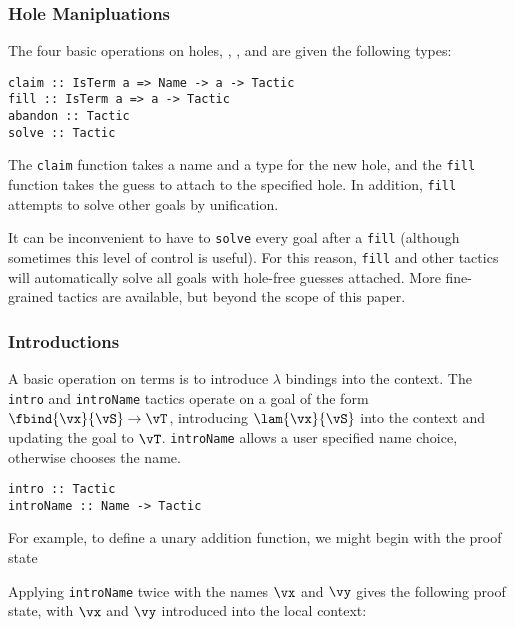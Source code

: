 \subsubsection{Hole Manipluations}

The four basic operations on holes, , ,
 and  are given the following types:
\begin{verbatim}
claim :: IsTerm a => Name -> a -> Tactic
fill :: IsTerm a => a -> Tactic
abandon :: Tactic
solve :: Tactic
\end{verbatim}

The \texttt{claim} function takes a name and a type for the new hole,
and the \texttt{fill} function takes the guess to attach to the
specified hole. In addition, \texttt{fill} attempts to solve other
goals by unification.

It can be inconvenient to have to \texttt{solve} every goal after a
\texttt{fill} (although sometimes this level of control is
useful). For this reason, \texttt{fill} and other tactics will
automatically solve all goals with hole-free guesses attached. More
fine-grained tactics are available, but beyond the scope of this paper.


\subsubsection{Introductions}

A basic operation on terms is to introduce $\lambda$ bindings into the
context. The \texttt{intro} and \texttt{introName} tactics operate on
a goal of the form $\fbind{\vx}{\vS}\to\vT$, introducing
$\lam{\vx}{\vS}$ into the context and updating the goal to
$\vT$. \texttt{introName} allows a user specified name choice,
otherwise \Ivor{} chooses the name.

\begin{verbatim}
intro :: Tactic
introName :: Name -> Tactic
\end{verbatim}

For example, to define a unary addition function, we might begin
with the proof state


Applying \texttt{introName} twice with the names $\vx$ and $\vy$ gives
the following proof state, with $\vx$ and $\vy$ introduced into the
local context:


